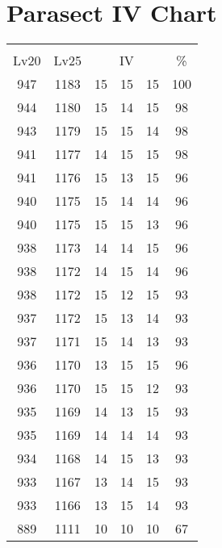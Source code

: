 \documentclass{article}%
\begin{document}
%
\normalsize%
\section{Parasect IV Chart}%
\label{sec:Parasect IV Chart}%
\renewcommand{\arraystretch}{1.5}%
\begin{tabular}{|c|c|c|c|c|c|}%
\hline%
\multicolumn{6}{|c|}{\textcolor{white}{ 
\linebreak{Parasect}
}%
\cellcolor{black}}\\%
\multicolumn{1}{|c}{Lv20}&\multicolumn{1}{c|}{Lv25}&\multicolumn{3}{c|}{IV}&\multicolumn{1}{|c|}{\%}\\%
\hline%
\rowcolor{color100}%
947&1183&15&15&15&100\\%
\hline%
\rowcolor{color98}%
944&1180&15&14&15&98\\%
\hline%
\rowcolor{color98}%
943&1179&15&15&14&98\\%
\hline%
\rowcolor{color98}%
941&1177&14&15&15&98\\%
\hline%
\rowcolor{color96}%
941&1176&15&13&15&96\\%
\hline%
\rowcolor{color96}%
940&1175&15&14&14&96\\%
\hline%
\rowcolor{color96}%
940&1175&15&15&13&96\\%
\hline%
\rowcolor{color96}%
938&1173&14&14&15&96\\%
\hline%
\rowcolor{color96}%
938&1172&14&15&14&96\\%
\hline%
\rowcolor{color93}%
938&1172&15&12&15&93\\%
\hline%
\rowcolor{color93}%
937&1172&15&13&14&93\\%
\hline%
\rowcolor{color93}%
937&1171&15&14&13&93\\%
\hline%
\rowcolor{color96}%
936&1170&13&15&15&96\\%
\hline%
\rowcolor{color93}%
936&1170&15&15&12&93\\%
\hline%
\rowcolor{color93}%
935&1169&14&13&15&93\\%
\hline%
\rowcolor{color93}%
935&1169&14&14&14&93\\%
\hline%
\rowcolor{color93}%
934&1168&14&15&13&93\\%
\hline%
\rowcolor{color93}%
933&1167&13&14&15&93\\%
\hline%
\rowcolor{color93}%
933&1166&13&15&14&93\\%
\hline%
\rowcolor{color91}%
889&1111&10&10&10&67\\%
\end{tabular}

%
\end{document}
